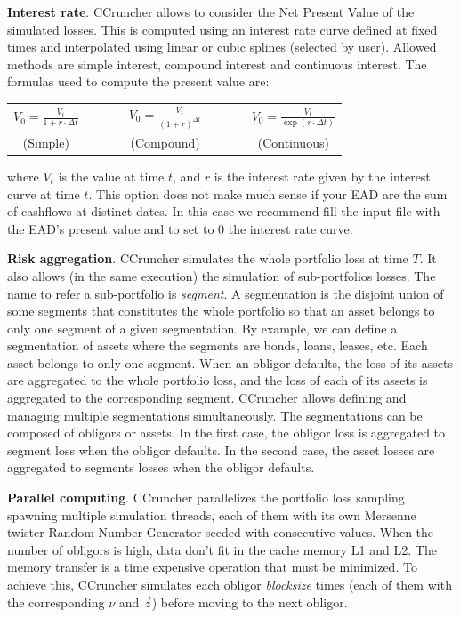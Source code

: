 \documentclass[11pt,fleqn]{book} %
\begin{document}
\textbf{Interest rate}. CCruncher allows to consider the Net Present Value 
of the simulated losses. This is computed using an interest rate curve 
defined at fixed times and interpolated using linear or cubic splines 
(selected by user). Allowed methods are simple interest, compound interest 
and continuous interest. The formulas used to compute the present value are:
\begin{center}
	\begin{tabular}{ccccc}
		$V_0 = \frac{V_t}{1+r \cdot \Delta t}$ & $\qquad$ &
		$V_0 = \frac{V_t}{(1+r)^{\Delta t}}$ & $\qquad$ &
		$V_0 = \frac{V_t}{\exp(r \cdot \Delta t)}$ \\
		(Simple) & $\qquad$ & (Compound) & $\qquad$ & (Continuous)
	\end{tabular}
\end{center}
where $V_t$ is the value at time $t$, and $r$ is the interest rate given 
by the interest curve at time $t$. This option does not make much sense
if your EAD are the sum of cashflows at distinct dates. In this case we 
recommend fill the input file with the EAD's present value and to set to 
$0$ the interest rate curve.

\textbf{Risk aggregation}. 
\label{ss:ra}
CCruncher simulates the whole portfolio loss at time $T$. It also allows (in 
the same execution) the simulation of sub-portfolios losses. The name to refer
a sub-portfolio is \emph{segment}. A segmentation is the disjoint union of some 
segments that constitutes the whole portfolio so that an asset belongs to only 
one segment of a given segmentation. By example, we can define a segmentation
of assets where the segments are bonds, loans, leases, etc. Each asset
belongs to only one segment. When an obligor defaults, the loss of its assets
are aggregated to the whole portfolio loss, and the loss of each of its assets
is aggregated to the corresponding segment. CCruncher allows defining and 
managing multiple segmentations simultaneously. The segmentations can be 
composed of obligors or assets. In the first case, the obligor loss is 
aggregated to segment loss when the obligor defaults. In the second case, the 
asset losses are aggregated to segments losses when the obligor defaults.

\textbf{Parallel computing}. 
CCruncher parallelizes the portfolio loss sampling spawning multiple simulation
threads, each of them with its own Mersenne twister Random Number Generator 
seeded with consecutive values. When the number of obligors is high, data 
don't fit in the cache memory L1 and L2. The memory transfer is a time expensive
operation that must be minimized. To achieve this, CCruncher simulates each 
obligor \emph{blocksize} times (each of them with the corresponding $\nu$ and 
$\vec{z}$) before moving to the next obligor.
\end{document}
